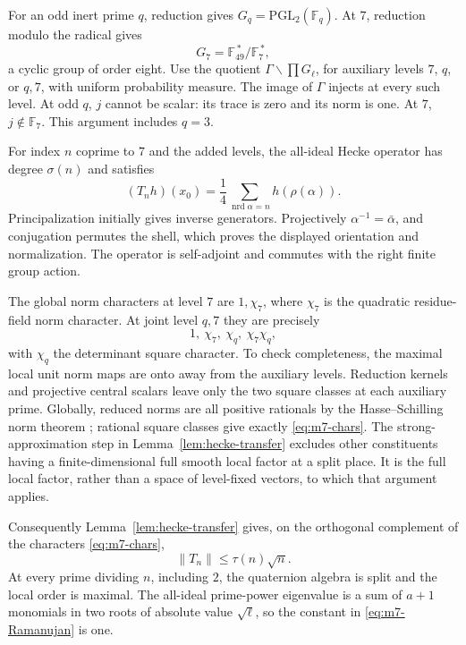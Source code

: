 For an odd inert prime \(q\), reduction gives
\(G_q=\mathrm{PGL}_2(\mathbb F_q)\).
At \(7\), reduction modulo the radical gives
\[
                 G_7=\mathbb F_{49}^{\,*}/\mathbb F_7^{\,*},
\]
a cyclic group of order eight. Use the quotient
\(\Gamma\backslash\prod G_\ell\), for auxiliary levels \(7\),
\(q\), or \(q,7\), with uniform probability measure.
The image of \(\Gamma\) injects at every such level.
At odd \(q\), \(j\) cannot be scalar: its trace is zero and its
norm is one. At \(7\), \(j\notin\mathbb F_7\).
This argument includes \(q=3\).

For index \(n\) coprime to \(7\) and the added levels, the
all-ideal Hecke operator has degree \(\sigma(n)\) and satisfies
\begin{equation}
 (T_nh)(x_0)=\frac14
          \sum_{\operatorname{nrd}\alpha=n}h(\rho(\alpha)).
                                                                    \label{eq:m7-Hecke}
\end{equation}
Principalization initially gives inverse generators. Projectively
\(\alpha^{-1}=\bar\alpha\), and conjugation permutes the shell,
which proves the displayed orientation and normalization.
The operator is self-adjoint and commutes with the right finite
group action.

The global norm characters at level \(7\) are \(1,\chi_7\), where
\(\chi_7\) is the quadratic residue-field norm character.
At joint level \(q,7\) they are precisely
\begin{equation}
                        1,\ \chi_7,\ \chi_q,\ \chi_7\chi_q,     \label{eq:m7-chars}
\end{equation}
with \(\chi_q\) the determinant square character.
To check completeness, the maximal local unit norm maps are onto
away from the auxiliary levels. Reduction kernels and projective
central scalars leave only the two square classes at each auxiliary
prime. Globally, reduced norms are all positive rationals by
the Hasse--Schilling norm theorem
\cite[Main Theorem 14.7.4]{Voight}; rational square classes give
exactly \eqref{eq:m7-chars}. The strong-approximation step in
Lemma~\ref{lem:hecke-transfer} excludes other constituents having
a finite-dimensional full smooth local factor at a split place.
It is the full local factor, rather than a space of level-fixed
vectors, to which that argument applies.

Consequently Lemma~\ref{lem:hecke-transfer} gives, on the
orthogonal complement of the characters \eqref{eq:m7-chars},
\begin{equation}
                         \|T_n\|\le\tau(n)\sqrt n.             \label{eq:m7-Ramanujan}
\end{equation}
At every prime dividing \(n\), including \(2\), the quaternion
algebra is split and the local order is maximal. The all-ideal
prime-power eigenvalue is a sum of \(a+1\) monomials in two
roots of absolute value \(\sqrt\ell\), so the constant in
\eqref{eq:m7-Ramanujan} is one.

